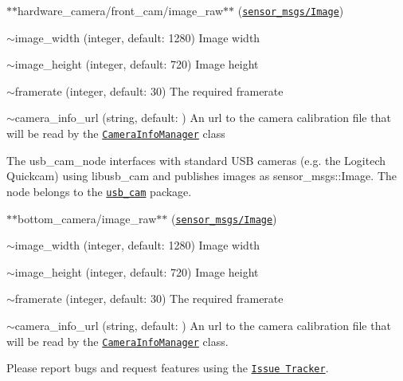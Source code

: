 \begin{DoxyItemize}
\item $\ast$$\ast${\ttfamily hardware\+\_\+camera/front\+\_\+cam/image\+\_\+raw}$\ast$$\ast$ (\href{http://docs.ros.org/api/sensor_msgs/html/msg/Image.html}{\tt sensor\+\_\+msgs/\+Image})
\end{DoxyItemize}


\begin{DoxyItemize}
\item {\ttfamily $\sim$image\+\_\+width} (integer, default\+: 1280) Image width
\item {\ttfamily $\sim$image\+\_\+height} (integer, default\+: 720) Image height
\item {\ttfamily $\sim$framerate} (integer, default\+: 30) The required framerate
\item {\ttfamily $\sim$camera\+\_\+info\+\_\+url} (string, default\+: ) An url to the camera calibration file that will be read by the \href{http://wiki.ros.org/CameraInfoManager}{\tt Camera\+Info\+Manager} class
\end{DoxyItemize}

The {\ttfamily usb\+\_\+cam\+\_\+node} interfaces with standard U\+SB cameras (e.\+g. the Logitech Quickcam) using libusb\+\_\+cam and publishes images as {\ttfamily sensor\+\_\+msgs\+::\+Image}. The node belongs to the \href{http://wiki.ros.org/usb_cam}{\tt usb\+\_\+cam} package.


\begin{DoxyItemize}
\item $\ast$$\ast${\ttfamily bottom\+\_\+camera/image\+\_\+raw}$\ast$$\ast$ (\href{http://docs.ros.org/api/sensor_msgs/html/msg/Image.html}{\tt sensor\+\_\+msgs/\+Image})
\end{DoxyItemize}


\begin{DoxyItemize}
\item {\ttfamily $\sim$image\+\_\+width} (integer, default\+: 1280) Image width
\item {\ttfamily $\sim$image\+\_\+height} (integer, default\+: 720) Image height
\item {\ttfamily $\sim$framerate} (integer, default\+: 30) The required framerate
\item {\ttfamily $\sim$camera\+\_\+info\+\_\+url} (string, default\+: ) An url to the camera calibration file that will be read by the \href{http://wiki.ros.org/CameraInfoManager}{\tt Camera\+Info\+Manager} class.
\end{DoxyItemize}

Please report bugs and request features using the \href{https://github.com/AUV-IITK/auv2018/issues}{\tt Issue Tracker}. 